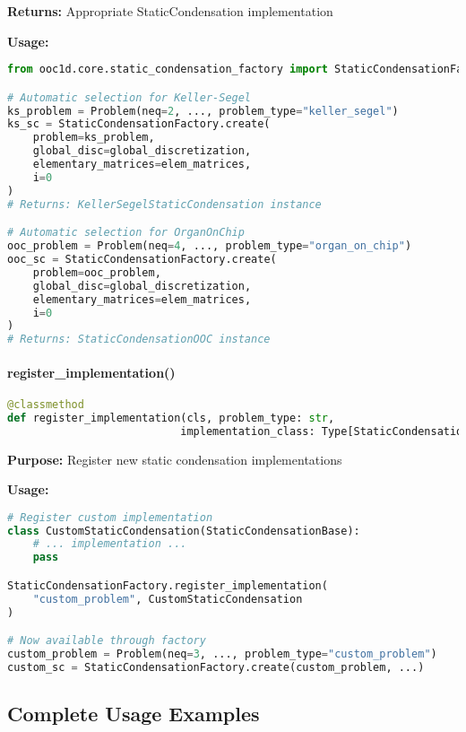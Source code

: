 \textbf{Returns:} Appropriate StaticCondensation implementation

\textbf{Usage:}
\begin{lstlisting}[language=Python, caption=Factory Usage Examples]
from ooc1d.core.static_condensation_factory import StaticCondensationFactory

# Automatic selection for Keller-Segel
ks_problem = Problem(neq=2, ..., problem_type="keller_segel")
ks_sc = StaticCondensationFactory.create(
    problem=ks_problem,
    global_disc=global_discretization,
    elementary_matrices=elem_matrices,
    i=0
)
# Returns: KellerSegelStaticCondensation instance

# Automatic selection for OrganOnChip  
ooc_problem = Problem(neq=4, ..., problem_type="organ_on_chip")
ooc_sc = StaticCondensationFactory.create(
    problem=ooc_problem,
    global_disc=global_discretization,
    elementary_matrices=elem_matrices,
    i=0
)
# Returns: StaticCondensationOOC instance
\end{lstlisting}

\paragraph{register\_implementation()}\leavevmode
\begin{lstlisting}[language=Python, caption=Register Implementation Method]
@classmethod
def register_implementation(cls, problem_type: str, 
                           implementation_class: Type[StaticCondensationBase])
\end{lstlisting}

\textbf{Purpose:} Register new static condensation implementations

\textbf{Usage:}
\begin{lstlisting}[language=Python, caption=Register New Implementation]
# Register custom implementation
class CustomStaticCondensation(StaticCondensationBase):
    # ... implementation ...
    pass

StaticCondensationFactory.register_implementation(
    "custom_problem", CustomStaticCondensation
)

# Now available through factory
custom_problem = Problem(neq=3, ..., problem_type="custom_problem")
custom_sc = StaticCondensationFactory.create(custom_problem, ...)
\end{lstlisting}

\subsection{Complete Usage Examples}
\label{subsec:complete_usage_examples}

